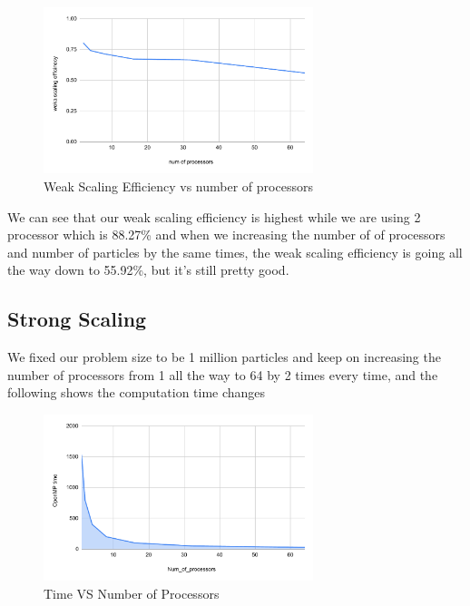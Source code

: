 \documentclass{article}
\begin{document}
\begin{figure}[H] %
\centering %
\includegraphics[width=0.7\textwidth]{weka scaling efficinecy vs. num of processors.pdf} %
\caption{Weak Scaling Efficiency vs number of processors} %
\label{Weak Scaling Efficiency vs number of processors} %
\end{figure}

We can see that our weak scaling efficiency is highest while we are using 2 processor which is 88.27\% and when we increasing the number of of processors and number of particles by the same times, the weak scaling efficiency is going all the way down to 55.92\%, but it's still pretty good.

\subsection{Strong Scaling}

We fixed our problem size to be 1 million particles and keep on increasing the number of processors from 1 all the way to 64 by 2 times every time, and the following shows the computation time changes
\begin{figure}[H] %
\centering %
\includegraphics[width=0.7\textwidth]{OpenMP time vs. Num_of_processors_strong.pdf} %
\caption{Time VS Number of Processors} %
\label{Time VS Number of Processors} %
\end{figure}
\end{document}

